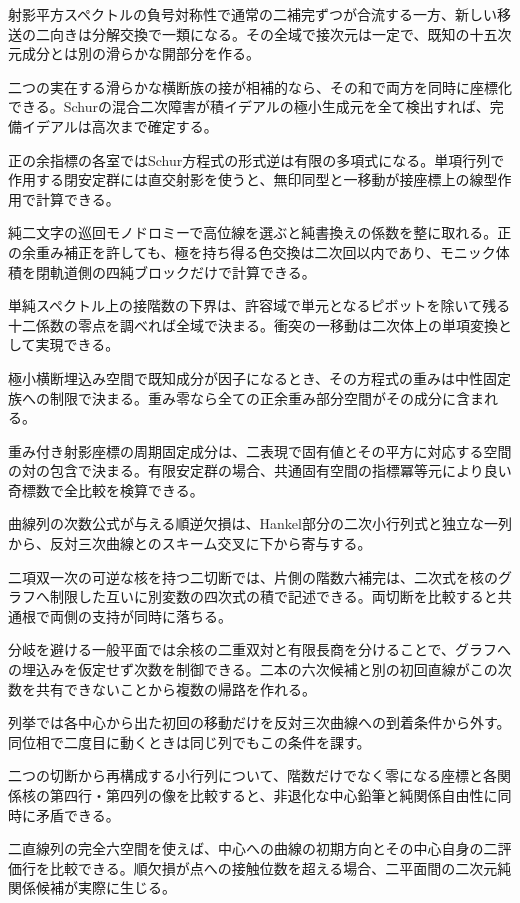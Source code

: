 \documentclass[11pt,a4paper]{ltjsarticle}
\begin{document}
射影平方スペクトルの負号対称性で通常の二補完ずつが合流する一方、新しい移送の二向きは分解交換で一類になる。その全域で接次元は一定で、既知の十五次元成分とは別の滑らかな開部分を作る。

二つの実在する滑らかな横断族の接が相補的なら、その和で両方を同時に座標化できる。Schurの混合二次障害が積イデアルの極小生成元を全て検出すれば、完備イデアルは高次まで確定する。

正の余指標の各室ではSchur方程式の形式逆は有限の多項式になる。単項行列で作用する閉安定群には直交射影を使うと、無印同型と一移動が接座標上の線型作用で計算できる。

純二文字の巡回モノドロミーで高位線を選ぶと純書換えの係数を整に取れる。正の余重み補正を許しても、極を持ち得る色交換は二次回以内であり、モニック体積を閉軌道側の四純ブロックだけで計算できる。

単純スペクトル上の接階数の下界は、許容域で単元となるピボットを除いて残る十二係数の零点を調べれば全域で決まる。衝突の一移動は二次体上の単項変換として実現できる。

極小横断埋込み空間で既知成分が因子になるとき、その方程式の重みは中性固定族への制限で決まる。重み零なら全ての正余重み部分空間がその成分に含まれる。

重み付き射影座標の周期固定成分は、二表現で固有値とその平方に対応する空間の対の包含で決まる。有限安定群の場合、共通固有空間の指標冪等元により良い奇標数で全比較を検算できる。

曲線列の次数公式が与える順逆欠損は、Hankel部分の二次小行列式と独立な一列から、反対三次曲線とのスキーム交叉に下から寄与する。

二項双一次の可逆な核を持つ二切断では、片側の階数六補完は、二次式を核のグラフへ制限した互いに別変数の四次式の積で記述できる。両切断を比較すると共通根で両側の支持が同時に落ちる。

分岐を避ける一般平面では余核の二重双対と有限長商を分けることで、グラフへの埋込みを仮定せず次数を制御できる。二本の六次候補と別の初回直線がこの次数を共有できないことから複数の帰路を作れる。

列挙では各中心から出た初回の移動だけを反対三次曲線への到着条件から外す。同位相で二度目に動くときは同じ列でもこの条件を課す。

二つの切断から再構成する小行列について、階数だけでなく零になる座標と各関係核の第四行・第四列の像を比較すると、非退化な中心鉛筆と純関係自由性に同時に矛盾できる。

二直線列の完全六空間を使えば、中心への曲線の初期方向とその中心自身の二評価行を比較できる。順欠損が点への接触位数を超える場合、二平面間の二次元純関係候補が実際に生じる。
\end{document}
